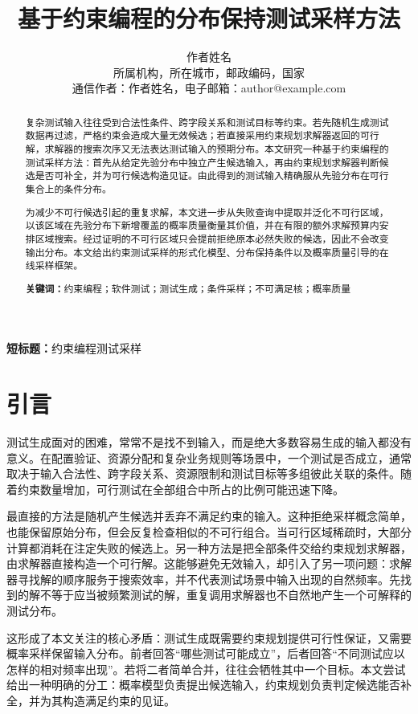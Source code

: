\documentclass[UTF8, fontset=none, a4paper, 12pt]{ctexart}
\title{\textbf{基于约束编程的分布保持测试采样方法}}
\author{%
  作者姓名\\[3pt]
  \small 所属机构，所在城市，邮政编码，国家\\
  \small 通信作者：作者姓名，电子邮箱：author@example.com
}
\date{}
\newcommand{\shorttitle}{约束编程测试采样}
\begin{document}
\maketitle
\vspace{-1.5em}
\begin{center}
  \small\textbf{短标题：}\shorttitle
\end{center}

\begin{abstract}
复杂测试输入往往受到合法性条件、跨字段关系和测试目标等约束。若先随机生成测试数据再过滤，严格约束会造成大量无效候选；若直接采用约束规划求解器返回的可行解，求解器的搜索次序又无法表达测试输入的预期分布。本文研究一种基于约束编程的测试采样方法：首先从给定先验分布中独立产生候选输入，再由约束规划求解器判断候选是否可补全，并为可行候选构造见证。由此得到的测试输入精确服从先验分布在可行集合上的条件分布。

为减少不可行候选引起的重复求解，本文进一步从失败查询中提取并泛化不可行区域，以该区域在先验分布下新增覆盖的概率质量衡量其价值，并在有限的额外求解预算内安排区域搜索。经过证明的不可行区域只会提前拒绝原本必然失败的候选，因此不会改变输出分布。本文给出约束测试采样的形式化模型、分布保持条件以及概率质量引导的在线采样框架。

\noindent\textbf{关键词：}约束编程；软件测试；测试生成；条件采样；不可满足核；概率质量
\end{abstract}

\section{引言}

测试生成面对的困难，常常不是找不到输入，而是绝大多数容易生成的输入都没有意义。在配置验证、资源分配和复杂业务规则等场景中，一个测试是否成立，通常取决于输入合法性、跨字段关系、资源限制和测试目标等多组彼此关联的条件。随着约束数量增加，可行测试在全部组合中所占的比例可能迅速下降。

最直接的方法是随机产生候选并丢弃不满足约束的输入。这种拒绝采样概念简单，也能保留原始分布，但会反复检查相似的不可行组合。当可行区域稀疏时，大部分计算都消耗在注定失败的候选上。另一种方法是把全部条件交给约束规划求解器，由求解器直接构造一个可行解。这能够避免无效输入，却引入了另一项问题：求解器寻找解的顺序服务于搜索效率，并不代表测试场景中输入出现的自然频率。先找到的解不等于应当被频繁测试的解，重复调用求解器也不自然地产生一个可解释的测试分布。

这形成了本文关注的核心矛盾：测试生成既需要约束规划提供可行性保证，又需要概率采样保留输入分布。前者回答“哪些测试可能成立”，后者回答“不同测试应以怎样的相对频率出现”。若将二者简单合并，往往会牺牲其中一个目标。本文尝试给出一种明确的分工：概率模型负责提出候选输入，约束规划负责判定候选能否补全，并为其构造满足约束的见证。
\end{document}
